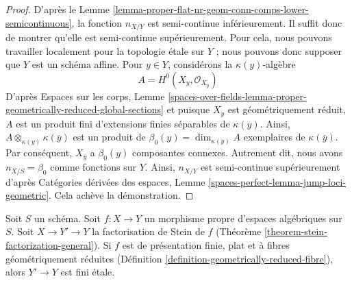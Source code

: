 \begin{proof}
D'après le Lemme \ref{lemma-proper-flat-nr-geom-conn-comps-lower-semicontinuous},
la fonction $n_{X/Y}$ est semi-continue inférieurement.
Il suffit donc de montrer qu'elle est semi-continue supérieurement.
Pour cela, nous pouvons travailler localement pour la topologie étale sur $Y$ ; nous
pouvons donc supposer que $Y$ est un schéma affine.
Pour $y \in Y$, considérons la $\kappa(y)$-algèbre
$$
A = H^0(X_y, \mathcal{O}_{X_y})
$$
D'après Espaces sur les corps, Lemme
\ref{spaces-over-fields-lemma-proper-geometrically-reduced-global-sections}
et puisque $X_y$ est géométriquement réduit,
$A$ est un produit fini d'extensions finies séparables de $\kappa(y)$.
Ainsi, $A \otimes_{\kappa(y)} \kappa(\overline{y})$ est un produit
de $\beta_0(y) = \dim_{\kappa(y)} A$ exemplaires de $\kappa(\overline{y})$.
Par conséquent, $X_{\overline{y}}$ a $\beta_0(y)$ composantes connexes.
Autrement dit, nous avons $n_{X/S} = \beta_0$ comme fonctions sur $Y$.
Ainsi, $n_{X/Y}$ est semi-continue supérieurement d'après
Catégories dérivées des espaces, Lemme
\ref{spaces-perfect-lemma-jump-loci-geometric}.
Cela achève la démonstration.
\end{proof}

\begin{lemma}
\label{lemma-stein-factorization-etale}
Soit $S$ un schéma.
Soit $f : X \to Y$ un morphisme propre d'espaces algébriques sur $S$.
Soit $X \to Y' \to Y$ la factorisation de Stein de $f$
(Théorème \ref{theorem-stein-factorization-general}).
Si $f$ est de présentation finie, plat et à fibres
géométriquement réduites (Définition \ref{definition-geometrically-reduced-fibre}),
alors $Y' \to Y$ est fini étale.
\end{lemma}

